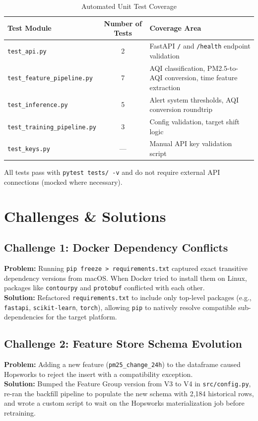 \documentclass[11pt,a4paper]{article}
\begin{document}
\begin{table}[h!]
\centering
\small
\begin{tabularx}{\textwidth}{l c X}
\toprule
\textbf{Test Module} & \textbf{Number of Tests} & \textbf{Coverage Area} \\
\midrule
\texttt{test\_api.py} & 2 & FastAPI \texttt{/} and \texttt{/health} endpoint validation \\
\texttt{test\_feature\_pipeline.py} & 7 & AQI classification, PM2.5-to-AQI conversion, time feature extraction \\
\texttt{test\_inference.py} & 5 & Alert system thresholds, AQI conversion roundtrip \\
\texttt{test\_training\_pipeline.py} & 3 & Config validation, target shift logic \\
\texttt{test\_keys.py} & --- & Manual API key validation script \\
\bottomrule
\end{tabularx}
\caption{Automated Unit Test Coverage}
\label{tab:tests}
\end{table}

All tests pass with \texttt{pytest tests/ -v} and do not require external API connections (mocked where necessary).

\section{Challenges \& Solutions}

\subsection{Challenge 1: Docker Dependency Conflicts}
\textbf{Problem:} Running \texttt{pip freeze > requirements.txt} captured exact transitive dependency versions from macOS. When Docker tried to install them on Linux, packages like \texttt{contourpy} and \texttt{protobuf} conflicted with each other.\\
\textbf{Solution:} Refactored \texttt{requirements.txt} to include only top-level packages (e.g., \texttt{fastapi}, \texttt{scikit-learn}, \texttt{torch}), allowing \texttt{pip} to natively resolve compatible sub-dependencies for the target platform.

\subsection{Challenge 2: Feature Store Schema Evolution}
\textbf{Problem:} Adding a new feature (\texttt{pm25\_change\_24h}) to the dataframe caused Hopsworks to reject the insert with a compatibility exception.\\
\textbf{Solution:} Bumped the Feature Group version from V3 to V4 in \texttt{src/config.py}, re-ran the backfill pipeline to populate the new schema with 2,184 historical rows, and wrote a custom script to wait on the Hopsworks materialization job before retraining.
\end{document}
